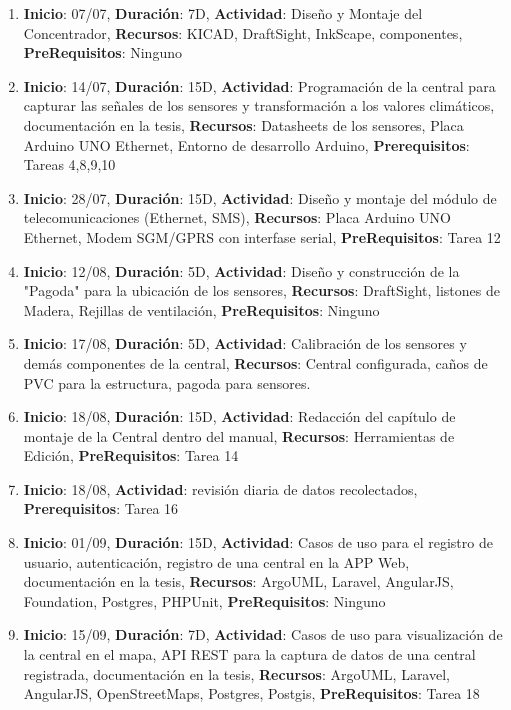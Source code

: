 \documentclass[a4paper,11pt, spanish]{article}
\begin{document}
\begin{enumerate}
\item \textbf{Inicio}: 07/07, \textbf{Duración}: 7D, \textbf{Actividad}: Diseño y Montaje del Concentrador, \textbf{Recursos}: KICAD, DraftSight, InkScape, componentes, \textbf{PreRequisitos}: Ninguno 
\item \textbf{Inicio}: 14/07, \textbf{Duración}: 15D, \textbf{Actividad}: Programación de la central para capturar las señales de los sensores y transformación a los valores climáticos, documentación en la tesis, \textbf{Recursos}: Datasheets de los sensores, Placa Arduino UNO Ethernet, Entorno de desarrollo Arduino, \textbf{Prerequisitos}: Tareas 4,8,9,10
\item \textbf{Inicio}: 28/07, \textbf{Duración}: 15D, \textbf{Actividad}: Diseño y montaje del módulo de telecomunicaciones (Ethernet, SMS), \textbf{Recursos}: Placa Arduino UNO Ethernet, Modem SGM/GPRS con interfase serial, \textbf{PreRequisitos}: Tarea 12
\item \textbf{Inicio}: 12/08, \textbf{Duración}: 5D, \textbf{Actividad}: Diseño y construcción de la "Pagoda" para la ubicación de los sensores, \textbf{Recursos}: DraftSight, listones de Madera, Rejillas de ventilación, \textbf{PreRequisitos}: Ninguno
\item \textbf{Inicio}: 17/08, \textbf{Duración}: 5D, \textbf{Actividad}: Calibración de los sensores y demás componentes de la central, \textbf{Recursos}: Central configurada, caños de PVC para la estructura, pagoda para sensores.
\item \textbf{Inicio}: 18/08, \textbf{Duración}: 15D, \textbf{Actividad}: Redacción del capítulo de montaje de la Central dentro del manual, \textbf{Recursos}: Herramientas de Edición, \textbf{PreRequisitos}: Tarea 14
\item \textbf{Inicio}: 18/08, \textbf{Actividad}: revisión diaria de datos recolectados, \textbf{Prerequisitos}: Tarea 16
\item \textbf{Inicio}: 01/09, \textbf{Duración}: 15D, \textbf{Actividad}: Casos de uso para el registro de usuario, autenticación, registro de una central en la APP Web, documentación en la tesis, \textbf{Recursos}: ArgoUML, Laravel, AngularJS, Foundation, Postgres, PHPUnit, \textbf{PreRequisitos}: Ninguno
\item \textbf{Inicio}: 15/09, \textbf{Duración}: 7D, \textbf{Actividad}: Casos de uso para visualización de la central en el mapa, API REST para la captura de datos de una central registrada, documentación en la tesis, \textbf{Recursos}: ArgoUML, Laravel, AngularJS, OpenStreetMaps, Postgres, Postgis, \textbf{PreRequisitos}: Tarea 18

\end{enumerate}
\end{document}
